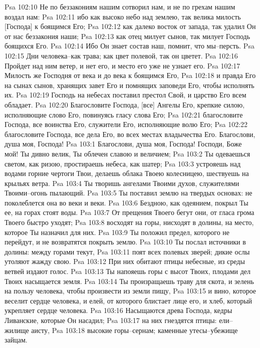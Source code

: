 Psa 102:10  Не по беззакониям нашим сотворил нам, и не по грехам нашим воздал нам:
Psa 102:11  ибо как высоко небо над землею, так велика милость [Господа] к боящимся Его;
Psa 102:12  как далеко восток от запада, так удалил Он от нас беззакония наши;
Psa 102:13  как отец милует сынов, так милует Господь боящихся Его.
Psa 102:14  Ибо Он знает состав наш, помнит, что мы--персть.
Psa 102:15  Дни человека--как трава; как цвет полевой, так он цветет.
Psa 102:16  Пройдет над ним ветер, и нет его, и место его уже не узнает его.
Psa 102:17  Милость же Господня от века и до века к боящимся Его,
Psa 102:18  и правда Его на сынах сынов, хранящих завет Его и помнящих заповеди Его, чтобы исполнять их.
Psa 102:19  Господь на небесах поставил престол Свой, и царство Его всем обладает.
Psa 102:20  Благословите Господа, [все] Ангелы Его, крепкие силою, исполняющие слово Его, повинуясь гласу слова Его;
Psa 102:21  благословите Господа, все воинства Его, служители Его, исполняющие волю Его;
Psa 102:22  благословите Господа, все дела Его, во всех местах владычества Его. Благослови, душа моя, Господа!
Psa 103:1  Благослови, душа моя, Господа! Господи, Боже мой! Ты дивно велик, Ты облечен славою и величием;
Psa 103:2  Ты одеваешься светом, как ризою, простираешь небеса, как шатер;
Psa 103:3  устрояешь над водами горние чертоги Твои, делаешь облака Твоею колесницею, шествуешь на крыльях ветра.
Psa 103:4  Ты творишь ангелами Твоими духов, служителями Твоими--огонь пылающий.
Psa 103:5  Ты поставил землю на твердых основах: не поколеблется она во веки и веки.
Psa 103:6  Бездною, как одеянием, покрыл Ты ее, на горах стоят воды.
Psa 103:7  От прещения Твоего бегут они, от гласа грома Твоего быстро уходят;
Psa 103:8  восходят на горы, нисходят в долины, на место, которое Ты назначил для них.
Psa 103:9  Ты положил предел, которого не перейдут, и не возвратятся покрыть землю.
Psa 103:10  Ты послал источники в долины: между горами текут,
Psa 103:11  поят всех полевых зверей; дикие ослы утоляют жажду свою.
Psa 103:12  При них обитают птицы небесные, из среды ветвей издают голос.
Psa 103:13  Ты напояешь горы с высот Твоих, плодами дел Твоих насыщается земля.
Psa 103:14  Ты произращаешь траву для скота, и зелень на пользу человека, чтобы произвести из земли пищу,
Psa 103:15  и вино, которое веселит сердце человека, и елей, от которого блистает лице его, и хлеб, который укрепляет сердце человека.
Psa 103:16  Насыщаются древа Господа, кедры Ливанские, которые Он насадил;
Psa 103:17  на них гнездятся птицы: ели--жилище аисту,
Psa 103:18  высокие горы--сернам; каменные утесы--убежище зайцам.
